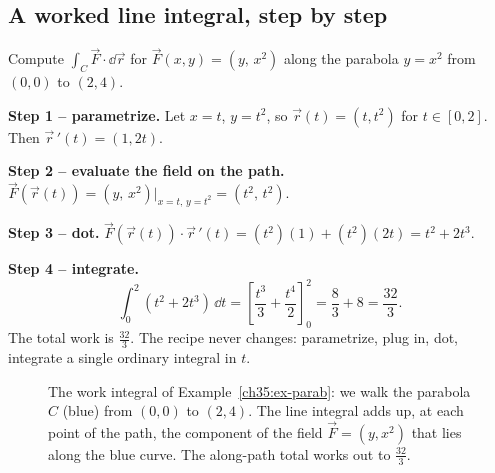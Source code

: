 \subsection{A worked line integral, step by step}

\begin{example}
\label{ch35:ex-parab}
Compute $\displaystyle\int_C \vec F\cdot\dd\vec r$ for $\vec F(x,y)=(y,\,x^2)$
along the parabola $y=x^2$ from $(0,0)$ to $(2,4)$.

\textbf{Step 1 -- parametrize.} Let $x=t$, $y=t^2$, so $\vec r(t)=(t,t^2)$ for
$t\in[0,2]$. Then $\vec r\,'(t)=(1,2t)$.

\textbf{Step 2 -- evaluate the field on the path.}
$\vec F(\vec r(t)) = (y,\,x^2)\big|_{x=t,\,y=t^2} = (t^2,\, t^2)$.

\textbf{Step 3 -- dot.}
$\vec F(\vec r(t))\cdot\vec r\,'(t) = (t^2)(1)+(t^2)(2t) = t^2 + 2t^3.$

\textbf{Step 4 -- integrate.}
\[
  \int_0^2 (t^2 + 2t^3)\,\dd t
  = \left[\frac{t^3}{3} + \frac{t^4}{2}\right]_0^2
  = \frac{8}{3} + 8 = \frac{32}{3}.
\]
The total work is $\tfrac{32}{3}$. The recipe never changes: parametrize, plug in,
dot, integrate a single ordinary integral in $t$.
\end{example}

\begin{figure}[H]
\centering
{}
\caption{The work integral of Example~\ref{ch35:ex-parab}: we walk the parabola
$C$ (blue) from $(0,0)$ to $(2,4)$. The line integral adds up, at each point of the
path, the component of the field $\vec F=(y,x^2)$ that lies along the blue curve.
The along-path total works out to $\tfrac{32}{3}$.}
\label{ch35:fig-work}
\end{figure}

